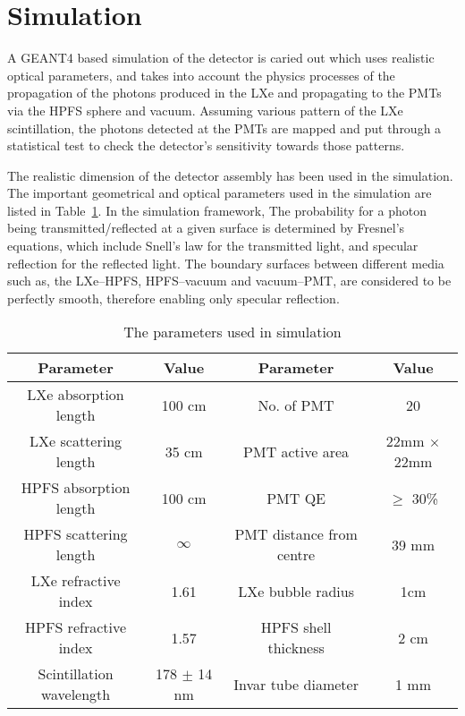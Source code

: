 \section{Simulation }
\label{sec:sim}
A GEANT4 based simulation of the detector is caried out which uses realistic optical parameters, 
and takes into account the physics processes of the propagation of the photons produced in the LXe 
and propagating to the PMTs via the HPFS sphere and vacuum. Assuming various pattern of the LXe 
scintillation, the photons detected at the PMTs are mapped and put through a statistical test to 
check the detector's sensitivity towards those patterns.

The realistic dimension of the detector assembly has been used in the simulation. The important 
geometrical and optical parameters used in the simulation are listed in Table~\ref{tab:OptPar}. 
In the simulation 
framework, The probability for a photon being transmitted/reflected at a given surface is 
determined by Fresnel’s equations, which include Snell’s law for the transmitted light, 
and specular reflection for the reflected light. The boundary surfaces between different media
such as, the LXe--HPFS, HPFS--vacuum and vacuum--PMT, are considered to be perfectly smooth, 
therefore enabling only specular reflection.

\begin{table}[h]
  \centering
  \caption{The parameters used in simulation}
  \label{tab:OptPar}
  \begin{tabular}{|c c||c c|}
  \hline
  Parameter & Value & Parameter & Value \\
  \hline
  LXe absorption length & 100 cm & No. of PMT & 20\\
  LXe scattering length & 35 cm & PMT active area & 22mm $\times$ 22mm\\
  HPFS absorption length & 100 cm & PMT QE & $\geq$ 30\% \\
  HPFS scattering length & $\infty$ & PMT distance from centre & 39 mm\\
  LXe refractive index & 1.61 & LXe bubble radius & 1cm\\
  HPFS refractive index & 1.57 & HPFS shell thickness & 2 cm \\
  Scintillation wavelength & 178 $\pm$ 14 nm & Invar tube diameter & 1 mm\\
  \hline
 \end{tabular}
\end{table}


